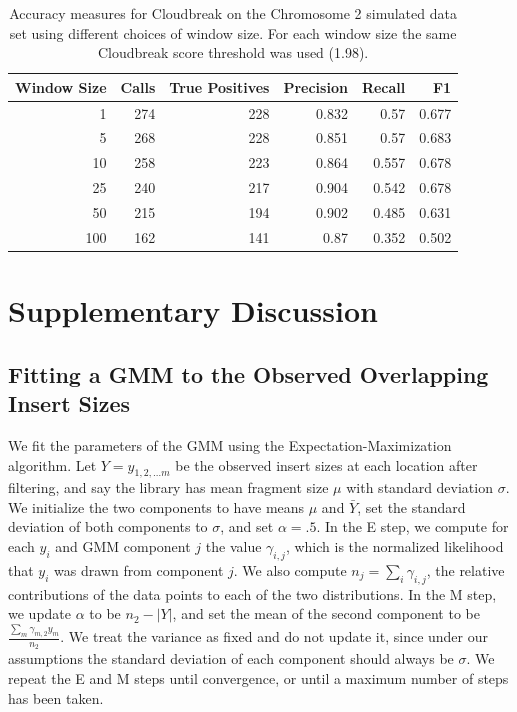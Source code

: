 \documentclass[11pt]{article}
\begin{document}
\newpage 

\begin{table}[h]
\begin{center}
\begin{tabular}{r|rrrrr}
 \hline
 Window Size & Calls & True Positives & Precision & Recall & F1 \\ 
 \hline
   1 & 274 & 228 & 0.832 & 0.57 & 0.677 \\ 
   5 & 268 & 228 & 0.851 & 0.57 & 0.683 \\ 
   10 & 258 & 223 & 0.864 & 0.557 & 0.678 \\ 
   25 & 240 & 217 & 0.904 & 0.542 & 0.678 \\ 
   50 & 215 & 194 & 0.902 & 0.485 & 0.631 \\ 
   100 & 162 & 141 & 0.87 & 0.352 & 0.502 \\  
\end{tabular}
\end{center}
\caption[Cloudbreak accuracy with varying window sizes.]{Accuracy measures for Cloudbreak on the Chromosome 2 simulated data set using different choices of window size. For each window size the same Cloudbreak score threshold was used (1.98).}
\label{chr2AccuracyByWindowSize}
\end{table}

\clearpage

\section{Supplementary Discussion}

\subsection{Fitting a GMM to the Observed Overlapping Insert Sizes}

We fit the parameters of the GMM using the Expectation-Maximization algorithm. Let $Y = y_{1,2, \ldots m}$ be the observed insert sizes at each location after filtering, and say the library has mean fragment size $\mu$ with standard deviation $\sigma$. We initialize the two components to have means $\mu$ and $\bar{Y}$, set the standard deviation of both components to $\sigma$, and set $\alpha = .5$. In the E step, we compute for each $y_i$ and GMM component $j$ the value $\gamma_{i,j}$, which is the normalized likelihood that $y_i$ was drawn from component $j$. We also compute $n_j = \sum_i{\gamma_{i,j}}$, the relative contributions of the data points to each of the two distributions. In the M step, we update $\alpha$ to be $n_2 - \left|Y\right|$, and set the mean of the second component to be $\frac{\sum_m{\gamma_{m,2}y_m}}{n_2}$. We treat the variance as fixed and do not update it, since under our assumptions the standard deviation of each component should always be $\sigma$. We repeat the E and M steps until convergence, or until a maximum number of steps has been taken.
\end{document}
